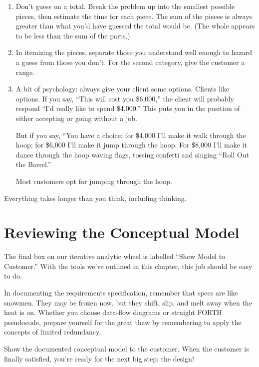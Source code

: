 \begin{enumerate}

\item Don't guess on a total. Break the problem up into the smallest possible
pieces, then estimate the time for each piece. The sum of the pieces is
always greater than what you'd have guessed the total would be. (The
whole appears to be less than the sum of the parts.)

\item In itemizing the pieces, separate those you understand well enough to
hazard a guess from those you don't. For the second category, give the
customer a range.

\item A bit of psychology: always give your client some options. Clients like
options. If you say, ``This will cost you \$6,000,'' the client will probably
respond ``I'd really like to spend \$4,000.'' This puts you in the position of
either accepting or going without a job.

But if you say, ``You have a choice: for \$4,000 I'll make it walk through the
hoop; for \$6,000 I'll make it jump through the hoop. For \$8,000 I'll make it
dance through the hoop waving flags, tossing confetti and
singing ``Roll Out the Barrel.''

Most customers opt for jumping through the hoop.
\end{enumerate}

\begin{tip}
Everything takes longer than you think, including thinking.
\end{tip}

\section{Reviewing the Conceptual Model}

\noindent The final box on our iterative analytic wheel is labelled ``Show Model to
Customer.'' With the tools we've outlined in this chapter, this job should
be easy to do.

In documenting the requirements specification, remember that
specs are like snowmen. They may be frozen now, but they shift, slip, and
melt away when the heat is on. Whether you choose data-flow diagrams
or straight FORTH pseudocode, prepare yourself for the great thaw by
remembering to apply the concepts of limited redundancy.

Show the documented conceptual model to the customer. When the
customer is finally satisfied, you're ready for the next big step: the
design!

